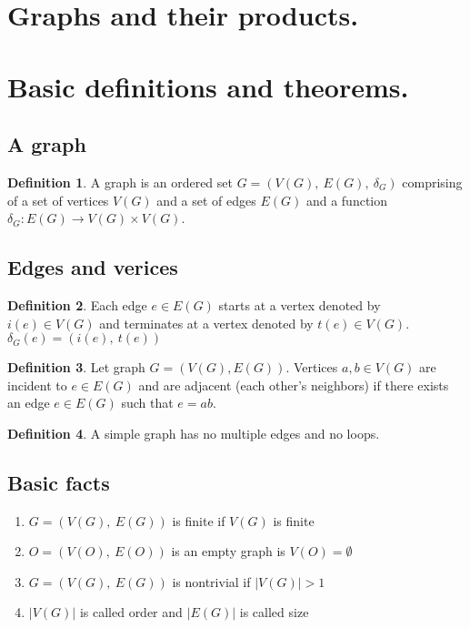 \documentclass{article}
\theoremstyle{definition}
\newtheorem{dd}{Definition}[section]
\begin{document}
\section*{\LARGE{Graphs and their products.}}

\section{Basic definitions and theorems.}

\subsection{A graph}

\begin{dd}
    A graph is an ordered set $G = \left( V(G),\ E(G),\ \delta_G \right)$ comprising of a set of vertices $V(G)$ and a set of edges $E(G)$ and a function $\delta_G: E(G) \to V(G) \times V(G)$.
\end{dd}

\subsection{Edges and verices}

\begin{dd}
    Each edge $e \in E(G)$ starts at a vertex denoted by $i(e) \in V(G)$ and terminates at a vertex denoted by $t(e) \in V(G)$. $\delta_G(e) = \left( i(e),\ t(e) \right)$
\end{dd}

\begin{dd}
    Let graph $G = \left( V(G), E(G) \right)$. Vertices $a, b \in V(G)$ are incident to $e \in E(G)$ and are adjacent (each other's neighbors) if there exists an edge $e \in E(G)$ such that $e = ab$.
\end{dd}

\begin{dd}
    A simple graph has no multiple edges and no loops.
\end{dd}

\subsection{Basic facts}

\begin{enumerate}
    \item $G = \left( V(G),\ E(G) \right)$ is finite if $V(G)$ is finite
    \item $O = \left( V(O),\ E(O) \right)$ is an empty graph is $V(O) = \emptyset$
    \item $G = \left( V(G),\ E(G) \right)$ is nontrivial if $|V(G)| > 1$
    \item $|V(G)|$ is called order and $|E(G)|$ is called size
\end{enumerate}
\end{document}
